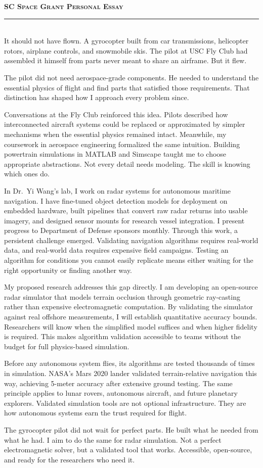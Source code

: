 \documentclass[12pt]{article}
\begin{document}
{\color{garnet}\large\textbf{\textsc{SC Space Grant Personal Essay}}}\\[-0.8em]
{\color{garnet}\rule{\textwidth}{0.5pt}}\\[0.2em]

It should not have flown. A gyrocopter built from car transmissions, helicopter rotors, airplane controls, and snowmobile skis. The pilot at USC Fly Club had assembled it himself from parts never meant to share an airframe. But it flew.

The pilot did not need aerospace-grade components. He needed to understand the essential physics of flight and find parts that satisfied those requirements. That distinction has shaped how I approach every problem since.

Conversations at the Fly Club reinforced this idea. Pilots described how interconnected aircraft systems could be replaced or approximated by simpler mechanisms when the essential physics remained intact. Meanwhile, my coursework in aerospace engineering formalized the same intuition. Building powertrain simulations in MATLAB and Simscape taught me to choose appropriate abstractions. Not every detail needs modeling. The skill is knowing which ones do.

In Dr.\ Yi Wang's lab, I work on radar systems for autonomous maritime navigation. I have fine-tuned object detection models for deployment on embedded hardware, built pipelines that convert raw radar returns into usable imagery, and designed sensor mounts for research vessel integration. I present progress to Department of Defense sponsors monthly. Through this work, a persistent challenge emerged. Validating navigation algorithms requires real-world data, and real-world data requires expensive field campaigns. Testing an algorithm for conditions you cannot easily replicate means either waiting for the right opportunity or finding another way.

My proposed research addresses this gap directly. I am developing an open-source radar simulator that models terrain occlusion through geometric ray-casting rather than expensive electromagnetic computation. By validating the simulator against real offshore measurements, I will establish quantitative accuracy bounds. Researchers will know when the simplified model suffices and when higher fidelity is required. This makes algorithm validation accessible to teams without the budget for full physics-based simulation.

Before any autonomous system flies, its algorithms are tested thousands of times in simulation. NASA's Mars 2020 lander validated terrain-relative navigation this way, achieving 5-meter accuracy after extensive ground testing. The same principle applies to lunar rovers, autonomous aircraft, and future planetary explorers. Validated simulation tools are not optional infrastructure. They are how autonomous systems earn the trust required for flight.

The gyrocopter pilot did not wait for perfect parts. He built what he needed from what he had. I aim to do the same for radar simulation. Not a perfect electromagnetic solver, but a validated tool that works. Accessible, open-source, and ready for the researchers who need it.
\end{document}
